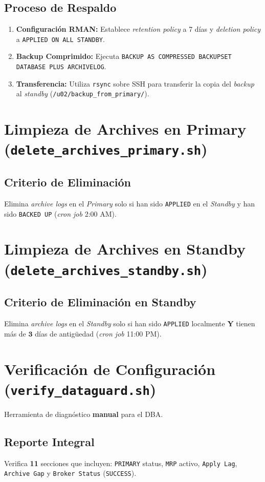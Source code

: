 \documentclass[11pt, a4paper]{report}
\begin{document}
\subsection{Proceso de Respaldo}
\begin{enumerate}
    \item \textbf{Configuración RMAN:} Establece \textit{retention policy} a 7 días y \textit{deletion policy} a \texttt{APPLIED ON ALL STANDBY}.
\item \textbf{Backup Comprimido:} Ejecuta \texttt{BACKUP AS COMPRESSED BACKUPSET DATABASE PLUS ARCHIVELOG}.
\item \textbf{Transferencia:} Utiliza \texttt{rsync} sobre SSH para transferir la copia del \textit{backup} al \textit{standby} (\texttt{/u02/backup\_from\_primary/}).
\end{enumerate}

\section{Limpieza de Archives en Primary (\texttt{delete\_archives\_primary.sh})}

\subsection{Criterio de Eliminación}
Elimina \textit{archive logs} en el \textit{Primary} solo si han sido \texttt{APPLIED} en el \textit{Standby} y han sido \texttt{BACKED UP} (\textit{cron job} 2:00 AM).
\section{Limpieza de Archives en Standby (\texttt{delete\_archives\_standby.sh})}

\subsection{Criterio de Eliminación en Standby}
Elimina \textit{archive logs} en el \textit{Standby} solo si han sido \texttt{APPLIED} localmente \textbf{Y} tienen más de $\mathbf{3}$ días de antigüedad (\textit{cron job} 11:00 PM).
\section{Verificación de Configuración (\texttt{verify\_dataguard.sh})}

Herramienta de diagnóstico \textbf{manual} para el DBA.
\subsection{Reporte Integral}
Verifica \textbf{11} secciones que incluyen: \texttt{PRIMARY} status, \texttt{MRP} activo, \texttt{Apply Lag}, \texttt{Archive Gap} y \texttt{Broker Status} (\texttt{SUCCESS}).
\end{document}
